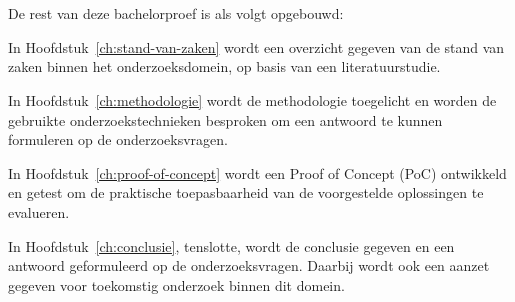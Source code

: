 \section{}%
\label{sec:opzet-bachelorproef}

De rest van deze bachelorproef is als volgt opgebouwd:

In Hoofdstuk~\ref{ch:stand-van-zaken} wordt een overzicht gegeven van de stand van zaken binnen het onderzoeksdomein, op basis van een literatuurstudie.

In Hoofdstuk~\ref{ch:methodologie} wordt de methodologie toegelicht en worden de gebruikte onderzoekstechnieken besproken om een antwoord te kunnen formuleren op de onderzoeksvragen.

In Hoofdstuk~\ref{ch:proof-of-concept} wordt een Proof of Concept (PoC) ontwikkeld en getest om de praktische toepasbaarheid van de voorgestelde oplossingen te evalueren.

In Hoofdstuk~\ref{ch:conclusie}, tenslotte, wordt de conclusie gegeven en een antwoord geformuleerd op de onderzoeksvragen. Daarbij wordt ook een aanzet gegeven voor toekomstig onderzoek binnen dit domein.

